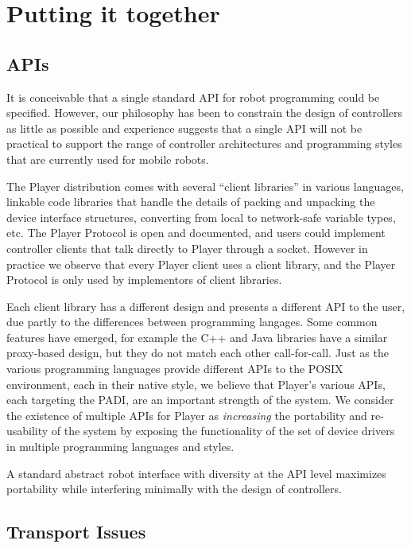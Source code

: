 \documentclass[letterpaper, 10 pt, conference]{iros03}
\begin{document}
\section{Putting it together}
\label{sect:putting-together}

\subsection{APIs}
\label{sect:client-libs}

It is conceivable that a single standard API for robot programming
could be specified. However, our philosophy has been to constrain the
design of controllers as little as possible and experience suggests
that a single API will not be practical to support the range of
controller architectures and programming styles that are currently
used for mobile robots.

  The Player distribution comes with several ``client libraries'' in
  various languages, linkable code libraries that handle the details
  of packing and unpacking the device interface structures, converting
  from local to network-safe variable types, etc. The Player Protocol
  is open and documented, and users could implement controller clients
  that talk directly to Player through a socket. However in practice
  we observe that every Player client uses a client library, and the
  Player Protocol is only used by implementors of client libraries.

  Each client library has a different design and presents a different
  API to the user, due partly to the differences between programming
  langages. Some common features have emerged, for example the C++ and
  Java libraries have a similar proxy-based design, but they do not
  match each other call-for-call.  Just as the various programming
  languages provide different APIs to the POSIX environment, each in
  their native style, we believe that Player's various APIs, each
  targeting the PADI, are an important strength of the system. We
  consider the existence of multiple APIs for Player as {\em
  increasing} the portability and re-usability of the system by
  exposing the functionality of the set of device drivers in multiple
  programming languages and styles.
 
 A standard abstract robot interface with diversity at the API level
maximizes portability while interfering minimally with the design of
controllers.

\subsection{Transport Issues}
\end{document}
